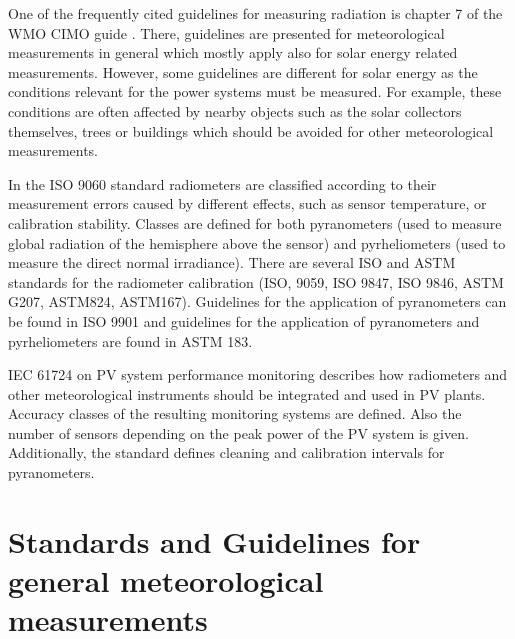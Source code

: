 One of the frequently cited guidelines for measuring radiation is chapter 7 of the WMO CIMO guide \cite{wmoguide2018}. There, guidelines are presented for meteorological measurements in general which mostly apply also for solar energy related measurements. However, some guidelines are different for solar energy as the conditions relevant for the power systems must be measured. For example, these conditions are often affected by nearby objects such as the solar collectors themselves, trees or buildings which should be avoided for other meteorological measurements.

In the ISO 9060 standard radiometers are classified according to their measurement errors caused by different effects, such as sensor temperature, or calibration stability. Classes are defined for both pyranometers (used to measure global radiation of the hemisphere above the sensor) and pyrheliometers (used to measure the direct normal irradiance). There are several ISO and ASTM standards for the radiometer calibration (ISO, 9059, ISO 9847, ISO 9846, ASTM G207, ASTM824, ASTM167).  Guidelines for the application of pyranometers can be found in ISO 9901 and guidelines for the application of pyranometers and pyrheliometers are found in ASTM 183.

IEC 61724 on PV system performance monitoring describes how radiometers and other meteorological instruments should be integrated and used in PV plants. Accuracy classes of the resulting monitoring systems are defined. Also the number of sensors depending on the peak power of the PV system is given. Additionally, the standard defines cleaning and calibration intervals for pyranometers.


\section{Standards and Guidelines for general meteorological measurements}\label{sec:met_standards}

